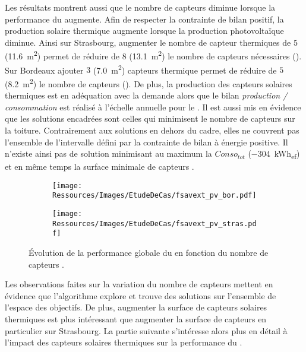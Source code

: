 Les résultats montrent aussi que le nombre de capteurs  diminue lorsque la
performance du  augmente. Afin de respecter la contrainte de bilan positif,
la production solaire thermique augmente lorsque la production photovoltaïque diminue.
Ainsi sur Strasbourg, augmenter le nombre de capteur thermiques de $5$ (\SI{11.6}{m^{2}})
permet de réduire de $8$ (\SI{13.1}{m^{2}}) le nombre de capteurs  nécessaires
(). Sur Bordeaux ajouter $3$ (\SI{7.0}{m^{2}}) capteurs
thermique permet de réduire de $5$ (\SI{8.2}{m^{2}}) le nombre de capteurs 
(). De plus, la production des capteurs solaires thermiques est en
adéquation avec la demande alors que le bilan \textit{production / consommation} est
réalisé à l’échelle annuelle pour le . Il est aussi mis en évidence que les
solutions encadrées sont celles qui minimisent le nombre de capteurs  sur la
toiture. Contrairement aux solutions en dehors du cadre, elles ne couvrent pas l’ensemble
de l’intervalle défini par la contrainte de bilan à énergie positive. Il n’existe ainsi
pas de solution minimisant au maximum la $Conso_{tot}$ (\SI{-304}{kWh_{ef}}) et en même
temps la surface minimale de capteurs .

\begin{figure}
    \centering
    \begin{subfigure}[b]{0.48\textwidth}
        \centering
        \texttt{[image: Ressources/Images/EtudeDeCas/fsavext\_pv\_bor.pdf]}
        \caption{}
        \label{fig:fsav_pv_bor}
    \end{subfigure}
    \quad
    \begin{subfigure}[b]{0.48\textwidth}
        \centering
        \texttt{[image: Ressources/Images/EtudeDeCas/fsavext\_pv\_stras.pdf]}
        \caption{}
        \label{fig:fsav_pv_stras}
    \end{subfigure}
    \caption[Évolution de la performance globale du  en fonction du nombre de capteurs ]
             {Évolution de la performance globale du  en fonction du nombre de capteurs .}
    \label{fig:fsav_pv_bor_stras}
\end{figure}

Les observations faites sur la variation du nombre de capteurs 
mettent en évidence que l’algorithme explore et trouve des solutions sur
l’ensemble de l’espace des objectifs. De plus, augmenter la surface de capteurs
solaires thermiques est plus intéressant que augmenter la surface de capteurs 
en particulier sur Strasbourg. La partie suivante s’intéresse alors plus en détail
à l’impact des capteurs solaires thermiques sur la performance du .

